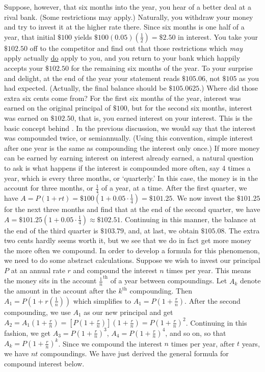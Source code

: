 Suppose, however, that six months into the year, you hear of a better deal at a rival bank. (Some restrictions may apply.) Naturally, you withdraw your money and try to invest it at the higher rate there.  Since six months is one half of a year, that initial $\$100$ yields $\$100(0.05)\left(\frac{1}{2}\right) = \$ 2.50$ in interest.  You take your $\$102.50$ off to the competitor and find out that those restrictions which \textit{may} apply actually \underline{do} apply to you, and you return to your bank which happily accepts your $\$102.50$ for the remaining six months of the year.  To your surprise and delight, at the end of the year your statement reads $\$105.06$, not $\$105$ as you had expected. (Actually, the final balance should be $\$105.0625$.)  Where did those extra six cents come from?  For the first six months of the year, interest was earned on the original principal of $\$100$, but for the second six months, interest was earned on $\$102.50$, that is, you earned interest on your interest.  This is the basic concept behind .  In the previous discussion, we would say that the interest was compounded twice, or semiannually. (Using this convention, simple interest after one year is the same as compounding the interest only once.)  If more money can be earned by earning interest on interest already earned, a natural question to ask is what happens if the interest is compounded more often, say $4$ times a year, which is every three months, or `quarterly.'  In this case, the money is in the account for three months, or $\frac{1}{4}$ of a year, at a time.  After the first quarter, we have $A = P(1+rt) =  \$100 \left(1 + 0.05 \cdot \frac{1}{4} \right) = \$101.25$.  We now invest the $\$101.25$ for the next three months and find that at the end of the second quarter, we have $A =  \$101.25 \left(1 + 0.05 \cdot \frac{1}{4} \right)\approx \$102.51$.  Continuing in this manner, the balance at the end of the third quarter is $\$103.79$, and, at last, we obtain $\$105.08$.  The extra two cents hardly seems worth it, but we see that we do in fact get more money the more often we compound.  In order to develop a formula for this phenomenon, we need to do some abstract calculations.  Suppose we wish to invest our principal $P$ at an annual rate $r$ and compound the interest $n$ times per year.  This means the money sits in the account $\frac{1}{n}^{\text{th}}$ of a year between compoundings.  Let $A_{k}$ denote the amount in the account after the $k^{\text{th}}$ compounding.  Then $A_{1} = P\left(1 + r\left(\frac{1}{n}\right)\right)$ which simplifies to $A_{1} = P \left(1 + \frac{r}{n}\right)$.  After the second compounding, we use $A_{1}$ as our new principal and get $A_{2} = A_{1} \left(1 + \frac{r}{n}\right) = \left[P \left(1 + \frac{r}{n}\right)\right]\left(1 + \frac{r}{n}\right) = P \left(1 + \frac{r}{n}\right)^2$.  Continuing in this fashion, we get $A_{3} =P \left(1 + \frac{r}{n}\right)^3$, $A_{4} =P \left(1 + \frac{r}{n}\right)^4$, and so on, so that $A_{k} = P \left(1 + \frac{r}{n}\right)^k$.  Since we compound the interest $n$ times per year, after $t$ years, we have $nt$ compoundings. We have just derived the general formula for compound interest below.


